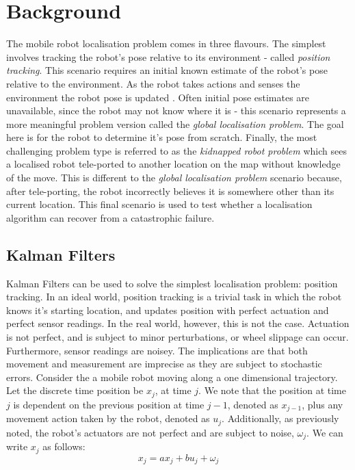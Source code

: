 \documentclass[a4paper]{article}
\begin{document}
\section{Background}
The mobile robot localisation problem comes in three flavours. The simplest involves tracking the robot's pose relative to its environment - called \textit{position tracking}. This scenario requires an initial known estimate of the robot's pose relative to the environment. As the robot takes actions and senses the environment the robot pose is updated \cite{Thrun:1999}. Often initial pose estimates are unavailable, since the robot may not know where it is - this scenario represents a more meaningful problem version called the \textit{global localisation problem}. The goal here is for the robot to determine it's pose from scratch. Finally, the most challenging problem type is referred to as the \textit{kidnapped robot problem} which sees a localised robot tele-ported to another location on the map without knowledge of the move. This is different to the \textit{global localisation problem} scenario because, after tele-porting, the robot incorrectly believes it is somewhere other than its current location. This final scenario is used to test whether a localisation algorithm can recover from a catastrophic failure.

\subsection{Kalman Filters}
Kalman Filters can be used to solve the simplest localisation problem: position tracking. In an ideal world, position tracking is a trivial task in which the robot knows it's starting location, and updates position with perfect actuation and perfect sensor readings. In the real world, however, this is not the case. Actuation is not perfect, and is subject to minor perturbations, or wheel slippage can occur. Furthermore, sensor readings are noisey. The implications are that both movement and measurement are imprecise as they are subject to stochastic errors. Consider the a mobile robot moving along a one dimensional trajectory. Let the discrete time position be $x_j$, at time $j$. We note that the position at time $j$ is dependent on the previous position at time $j-1$, denoted as $x_{j-1}$, plus any movement action taken by the robot, denoted as $u_j$. Additionally, as previously noted, the robot's actuators are not perfect and are subject to noise, $\omega_j$. We can write $x_j$ as follows:
\begin{equation}
x_j = a x_j + b u_j + \omega_j
\end{equation}
\end{document}
